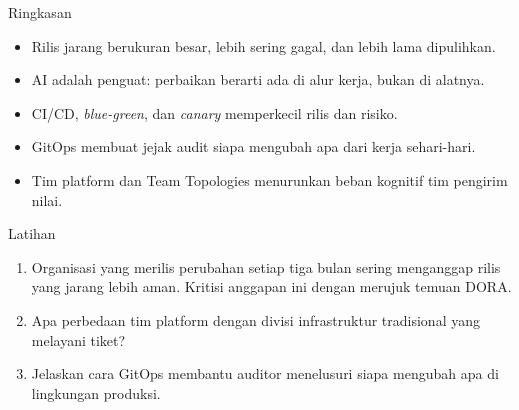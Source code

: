 \documentclass[aspectratio=169, table, 12pt]{beamer}
\begin{document}
\begin{frame}{{\Large Ringkasan}}
  \vspace{10pt}
  \begin{itemize}
    \item Rilis jarang berukuran besar, lebih sering gagal, dan lebih lama dipulihkan.
    \item AI adalah penguat: perbaikan berarti ada di alur kerja, bukan di alatnya.
    \item CI/CD, \textit{blue-green}, dan \textit{canary} memperkecil rilis dan risiko.
    \item GitOps membuat jejak audit siapa mengubah apa dari kerja sehari-hari.
    \item Tim platform dan Team Topologies menurunkan beban kognitif tim pengirim nilai.
  \end{itemize}
\end{frame}

\begin{frame}{{\Large Latihan}}
  \vspace{10pt}
  \begin{enumerate}
    \item Organisasi yang merilis perubahan setiap tiga bulan sering menganggap rilis yang
          jarang lebih aman. Kritisi anggapan ini dengan merujuk temuan DORA.
    \item Apa perbedaan tim platform dengan divisi infrastruktur tradisional yang melayani
          tiket?
    \item Jelaskan cara GitOps membantu auditor menelusuri siapa mengubah apa di lingkungan
          produksi.
  \end{enumerate}
\end{frame}
\end{document}
